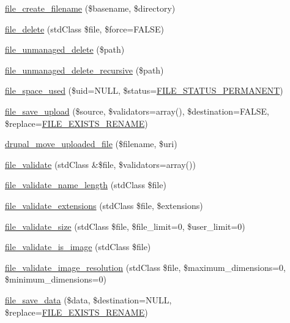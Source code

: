 \begin{DoxyCompactItemize}
\hyperlink{group__file_ga057bbfa5f89c4e4c75f0030e6f1f3809}{file\_\-create\_\-filename} (\$basename, \$directory)
\item 
\hyperlink{group__file_gac7503f0dcdea965d68e4a242e7760921}{file\_\-delete} (stdClass \$file, \$force=FALSE)
\item 
\hyperlink{group__file_ga336a7e83da1397131e665d1c6e97fc83}{file\_\-unmanaged\_\-delete} (\$path)
\item 
\hyperlink{group__file_gaf5c2cffaaf70f0f62a513f033d814899}{file\_\-unmanaged\_\-delete\_\-recursive} (\$path)
\item 
\hyperlink{group__file_gade600fbda0056f4aaea634e7178215b2}{file\_\-space\_\-used} (\$uid=NULL, \$status=\hyperlink{group__file_gaf208a7c7d7fd09276233583b22e4ee32}{FILE\_\-STATUS\_\-PERMANENT})
\item 
\hyperlink{group__file_gaec0ce0fef696b3d4f9e0809c84bd8f41}{file\_\-save\_\-upload} (\$source, \$validators=array(), \$destination=FALSE, \$replace=\hyperlink{group__file_ga5d6636d4ccd022885823b91f17a0f464}{FILE\_\-EXISTS\_\-RENAME})
\item 
\hyperlink{group__php__wrappers_gad2a800badd2c93efbff2a2905507e685}{drupal\_\-move\_\-uploaded\_\-file} (\$filename, \$uri)
\item 
\hyperlink{group__file_ga9edf58fdc552d61247bbf8322c434abf}{file\_\-validate} (stdClass \&\$file, \$validators=array())
\item 
\hyperlink{group__file_gaca56a55a4d3ee635cddf38903c1ed367}{file\_\-validate\_\-name\_\-length} (stdClass \$file)
\item 
\hyperlink{group__file_ga4036c6b78f904e5dd0273cf75eb474bb}{file\_\-validate\_\-extensions} (stdClass \$file, \$extensions)
\item 
\hyperlink{group__file_gad5dc623436b94f82d7a110adf8590915}{file\_\-validate\_\-size} (stdClass \$file, \$file\_\-limit=0, \$user\_\-limit=0)
\item 
\hyperlink{group__file_ga4cf6d97afe1580b23a14d96fede02d01}{file\_\-validate\_\-is\_\-image} (stdClass \$file)
\item 
\hyperlink{group__file_gaa90145fbf8065f644871c9d770e3cce4}{file\_\-validate\_\-image\_\-resolution} (stdClass \$file, \$maximum\_\-dimensions=0, \$minimum\_\-dimensions=0)
\item 
\hyperlink{group__file_ga7a01611c7c08b91876d93431207dd9b0}{file\_\-save\_\-data} (\$data, \$destination=NULL, \$replace=\hyperlink{group__file_ga5d6636d4ccd022885823b91f17a0f464}{FILE\_\-EXISTS\_\-RENAME})
\item 

\end{DoxyCompactItemize}
